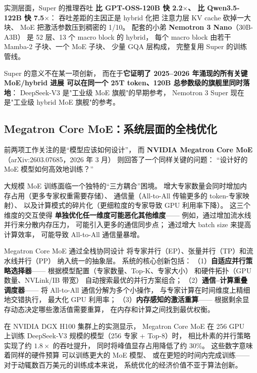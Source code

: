 实测层面，Super 的推理吞吐
\textbf{比 GPT-OSS-120B 快 2.2$\times$、
比 Qwen3.5-122B 快 7.5$\times$}：
吞吐差距的主因正是 hybrid 化把
注意力层 KV cache 砍掉一大块、
MoE 把激活参数压到稠密的 1/10。
配套的小弟 \textbf{Nemotron 3 Nano}（30B-A3B）
是 52 层、13 个 macro block 的 hybrid，
每个 macro block 由若干 Mamba-2 子块、一个 MoE 子块、
少量 GQA 层构成，
完整复用 Super 的训练管线。

Super 的意义不在某一项创新，
而在于\textbf{它证明了 2025--2026 年涌现的所有关键 MoE/hybrid 进展
可以在同一个 25T token、120B 总参数级的旗舰里同时落地}：
DeepSeek-V3 是"工业级 MoE 旗舰"的早期参考，
Nemotron 3 Super 现在是"工业级 hybrid MoE 旗舰"的参考。

\subsection{Megatron Core MoE：系统层面的全栈优化}

前两项工作关注的是“模型应该如何设计”，
而 \textbf{NVIDIA Megatron Core MoE}（arXiv:2603.07685，2026 年 3 月）%
则回答了一个同样关键的问题：
“设计好的 MoE 模型如何高效地训练？”

大规模 MoE 训练面临一个独特的“三方耦合”困境。
增大专家数量会同时增加内存占用（更多专家权重需要存储）、
通信量（All-to-All 传输更多的 token-专家映射）、
以及计算模式的碎片化（更细粒度的专家导致 GPU 利用率下降）。
这三个维度的交互使得
\textbf{单独优化任一维度可能恶化其他维度}——
例如，通过增加流水线并行来分散内存压力，
可能引入更多的通信同步点；
通过增大 batch size 来提高计算效率，
可能导致 All-to-All 通信量暴增。

Megatron Core MoE 通过全栈协同设计
将专家并行（EP）、张量并行（TP）和流水线并行（PP）
纳入统一的抽象层。
系统的核心创新包括：
（1）\textbf{自适应并行策略选择器}——
根据模型配置（专家数量、Top-K、专家大小）
和硬件拓扑（GPU 数量、NVLink/IB 带宽）
自动搜索最优的并行方案组合；
（2）\textbf{通信--计算重叠调度器}——
将 All-to-All 通信分解为多个小操作，
与专家计算在时间维度上精细地交错执行，
最大化 GPU 利用率；
（3）\textbf{内存感知的激活重算}——
根据剩余显存动态决定哪些激活值需要重算，
在内存和计算之间找到最优权衡。

在 NVIDIA DGX H100 集群上的实测显示，
Megatron Core MoE 在 256 GPU 上训练
DeepSeek-V3 规模的模型（256 专家 + Top-8）时，
相比朴素的并行策略实现了约 $1.8\times$ 的吞吐提升，
同时将峰值显存占用降低了约 30\%。
这些数字意味着同样的硬件预算
可以训练更大的 MoE 模型、
或在更短的时间内完成训练——
对于动辄数百万美元的训练成本来说，
系统优化的经济价值不亚于算法创新。

